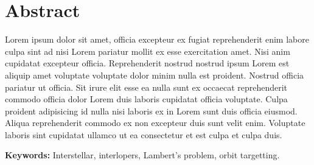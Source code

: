 \chapter*{Abstract}

Lorem ipsum dolor sit amet, officia excepteur ex fugiat reprehenderit enim
labore culpa sint ad nisi Lorem pariatur mollit ex esse exercitation amet. Nisi
anim cupidatat excepteur officia. Reprehenderit nostrud nostrud ipsum Lorem est
aliquip amet voluptate voluptate dolor minim nulla est proident. Nostrud officia
pariatur ut officia. Sit irure elit esse ea nulla sunt ex occaecat reprehenderit
commodo officia dolor Lorem duis laboris cupidatat officia voluptate. Culpa
proident adipisicing id nulla nisi laboris ex in Lorem sunt duis officia
eiusmod. Aliqua reprehenderit commodo ex non excepteur duis sunt velit enim.
Voluptate laboris sint cupidatat ullamco ut ea consectetur et est culpa et culpa
duis.

\vspace{4cm}
\textbf{Keywords:} Interstellar, interlopers, Lambert's problem, orbit targetting.
